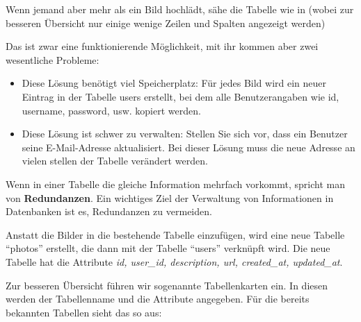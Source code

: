 Wenn jemand aber mehr als ein Bild hochlädt, sähe die Tabelle wie in  (wobei zur besseren Übersicht nur einige wenige Zeilen und Spalten angezeigt werden)
\begin{center}
  \begin{figure}[ht!]
  \end{figure}
  \label{fig:photoAlsSpalte}
\end{center}

Das ist zwar eine funktionierende Möglichkeit, mit ihr kommen aber zwei wesentliche Probleme:
\begin{itemize}
  \item Diese Lösung benötigt viel Speicherplatz: Für jedes Bild wird ein neuer Eintrag in der Tabelle users erstellt, bei dem alle Benutzerangaben wie id, username, password, usw. kopiert werden.
  \item Diese Lösung ist schwer zu verwalten: Stellen Sie sich vor, dass ein Benutzer seine E-Mail-Adresse aktualisiert. Bei dieser Lösung muss die neue Adresse an vielen stellen der Tabelle verändert werden.
\end{itemize}

Wenn in einer Tabelle die gleiche Information mehrfach vorkommt, spricht man von \textbf{Redundanzen}. Ein wichtiges Ziel der Verwaltung von Informationen in Datenbanken ist es, Redundanzen zu vermeiden.

Anstatt die Bilder in die bestehende Tabelle einzufügen, wird eine neue Tabelle \enquote{photos} erstellt, die dann mit der Tabelle \enquote{users} verknüpft wird. Die neue Tabelle hat die Attribute \textit{id, user\_id, description, url, created\_at, updated\_at}. 


Zur besseren Übersicht führen wir sogenannte Tabellenkarten ein. In diesen werden der Tabellenname und die Attribute angegeben. Für die bereits bekannten Tabellen sieht das so aus:

